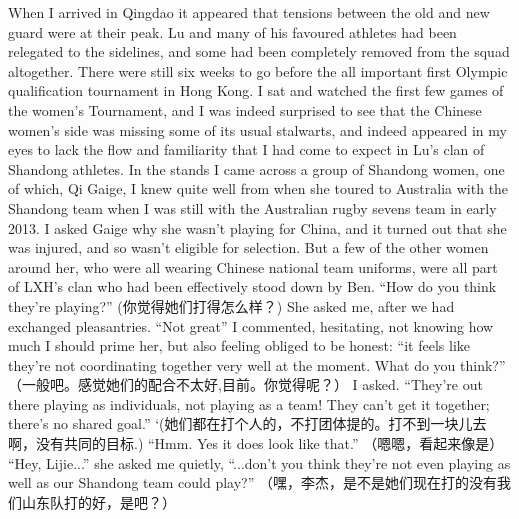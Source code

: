 \begin{CJK}{UTF8}{gbsn}
When I arrived in Qingdao it appeared that tensions between the old and new guard were at their peak.  Lu and many of his favoured athletes had been relegated to the sidelines, and some had been completely removed from the squad altogether.  There were still six weeks to go before the all important first Olympic qualification tournament in Hong Kong.  I sat and watched the first few games of the women's Tournament, and I was indeed surprised to see that the Chinese women's side was missing some of its usual stalwarts, and indeed appeared in my eyes to lack the flow and familiarity that I had come to expect in Lu's clan of Shandong athletes.  In the stands I came across a group of Shandong women, one of which, Qi Gaige, I knew quite well from when she toured to Australia with the Shandong team when I was still with the Australian rugby sevens team in early 2013.  I asked Gaige why she wasn't playing for China, and it turned out that she was injured, and so wasn't eligible for selection.  But a few of the other women around her, who were all wearing Chinese national team uniforms, were all part of LXH's clan who had been effectively stood down by Ben. ``How do you think they're playing?'' (你觉得她们打得怎么样？) She asked me, after we had exchanged pleasantries. ``Not great'' I commented, hesitating, not knowing how much I should prime her, but also feeling obliged to be honest: ``it feels like they’re not coordinating together very well at the moment.  What do you think?'' （一般吧。感觉她们的配合不太好,目前。你觉得呢？） I asked.  ``They’re out there playing as individuals, not playing as a team! They can't get it together; there's no shared goal.'' `(她们都在打个人的，不打团体提的。打不到一块儿去啊，没有共同的目标.)  ``Hmm. Yes it does look like that.'' （嗯嗯，看起来像是） ``Hey, Lijie...'' she asked me quietly, ``...don’t you think they’re not even playing as well as our Shandong team could play?'' （嘿，李杰，是不是她们现在打的没有我们山东队打的好，是吧？）


\end{CJK}
